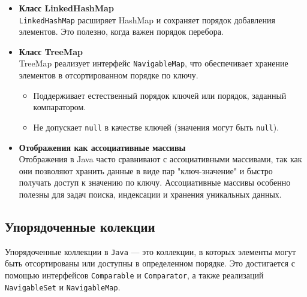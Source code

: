 \begin{itemize}
    \item \textbf{Класс LinkedHashMap} \\
    \texttt{LinkedHashMap} расширяет HashMap и сохраняет порядок добавления элементов. Это полезно, когда важен порядок перебора.
    
    \item \textbf{Класс TreeMap} \\
    TreeMap реализует интерфейс \texttt{NavigableMap}, что обеспечивает хранение элементов в отсортированном порядке по ключу.

     \begin{itemize}
        \item Поддерживает естественный порядок ключей или порядок, заданный компаратором.
        \item Не допускает \texttt{null} в качестве ключей (значения могут быть \texttt{null}).
    \end{itemize}
    
    \item \textbf{Отображения как ассоциативные массивы} \\
    Отображения в Java часто сравнивают с ассоциативными массивами, так как они позволяют хранить данные в виде пар "ключ-значение" и быстро получать доступ к значению по ключу. Ассоциативные массивы особенно полезны для задач поиска, индексации и хранения уникальных данных.
\end{itemize}

\subsection{Упорядоченные колекции}
Упорядоченные коллекции в \texttt{Java} — это коллекции, в которых элементы могут быть отсортированы или доступны в определенном порядке. Это достигается с помощью интерфейсов \texttt{Comparable} и \texttt{Comparator}, а также реализаций \texttt{NavigableSet} и \texttt{NavigableMap}.

